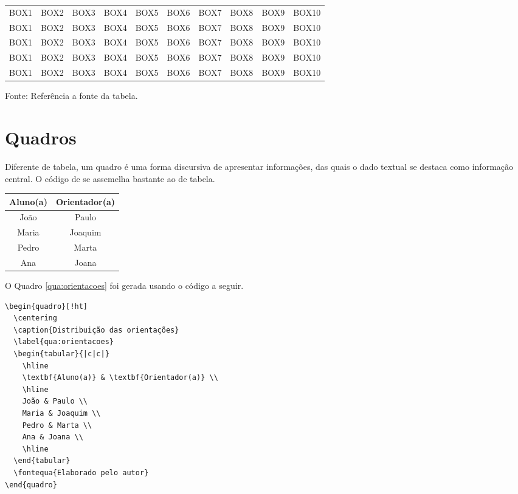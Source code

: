 \begin{landscape}
\begin{longtable}[c]{c|c|c|c|c|c|c|c|c|c}
	BOX1 & BOX2 & BOX3 & BOX4 & BOX5 & BOX6 &	BOX7 & BOX8 & BOX9 & BOX10 \\
	BOX1 & BOX2 & BOX3 & BOX4 & BOX5 & BOX6 &	BOX7 & BOX8 & BOX9 & BOX10 \\
	BOX1 & BOX2 & BOX3 & BOX4 & BOX5 & BOX6 &	BOX7 & BOX8 & BOX9 & BOX10 \\
	BOX1 & BOX2 & BOX3 & BOX4 & BOX5 & BOX6 &	BOX7 & BOX8 & BOX9 & BOX10 \\
	BOX1 & BOX2 & BOX3 & BOX4 & BOX5 & BOX6 &	BOX7 & BOX8 & BOX9 & BOX10 \\
\hline
\end{longtable}
\vspace{-8mm}
\begin{center}
\footnotesize
Fonte: Referência a fonte da tabela.
\end{center}
\end{landscape}

\section{Quadros}
\label{sec:quad} 

Diferente de tabela, um quadro é uma forma discursiva de apresentar informações, das quais o dado textual se destaca como informação central. O código de se assemelha bastante ao de tabela.

\begin{quadro}[!ht]
  \centering
  \caption{Distribuição das orientações}
  \label{qua:orientacoes}
  \begin{tabular}{|c|c|}
    \hline
    \textbf{Aluno(a)} & \textbf{Orientador(a)} \\
    \hline
    João & Paulo \\
    Maria & Joaquim \\
    Pedro & Marta \\
    Ana & Joana \\
    \hline
  \end{tabular}
\end{quadro}

O Quadro \ref{qua:orientacoes} foi gerada usando o código a seguir.

\begin{verbatim}
\begin{quadro}[!ht]
  \centering
  \caption{Distribuição das orientações}
  \label{qua:orientacoes}
  \begin{tabular}{|c|c|}
    \hline
    \textbf{Aluno(a)} & \textbf{Orientador(a)} \\
    \hline
    João & Paulo \\
    Maria & Joaquim \\
    Pedro & Marta \\
    Ana & Joana \\
    \hline
  \end{tabular}
  \fontequa{Elaborado pelo autor}
\end{quadro}
\end{verbatim}

